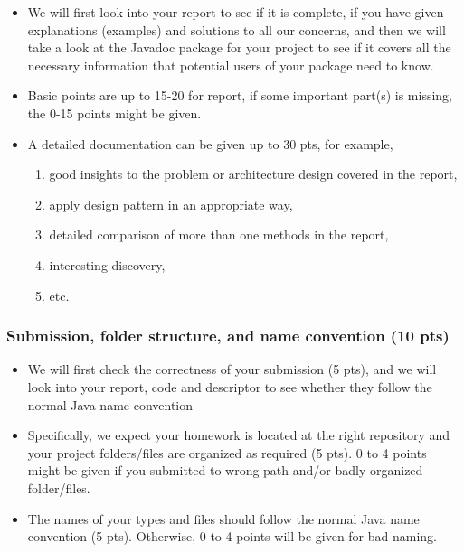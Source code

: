 \begin{itemize}

\item We will first look into your report to see if it is complete, if you have
given explanations (examples) and solutions to all our concerns, and then we will take a look at the Javadoc package for your project to see if it covers all the necessary information that potential users of your package need to know.

\item Basic points are up to 15-20 for report, if some
important part(s) is missing, the 0-15 points might be given.

\item A detailed documentation can be given up to 30 pts, for example,

\begin{enumerate}
\item good insights to the problem or architecture design covered in the report,
\item apply design pattern in an appropriate way,
\item detailed comparison of more than one methods in the report,
\item interesting discovery,
\item etc.
\end{enumerate}

\end{itemize}

\subsubsection{Submission, folder structure, and name convention (10 pts)}

\begin{itemize}

\item We will first check the correctness of your submission (5 pts), 
and we will look into your report, code and descriptor to see whether they follow 
the normal Java name convention 

\item Specifically, we expect your homework is located at the right repository 
and your project folders/files are organized as required (5 pts). 
0 to 4 points might be given if you submitted to wrong path and/or badly organized folder/files. 

\item The names of your types and files should follow the normal Java name convention (5 pts). 
Otherwise, 0 to 4 points will be given for bad naming. 


\end{itemize}

